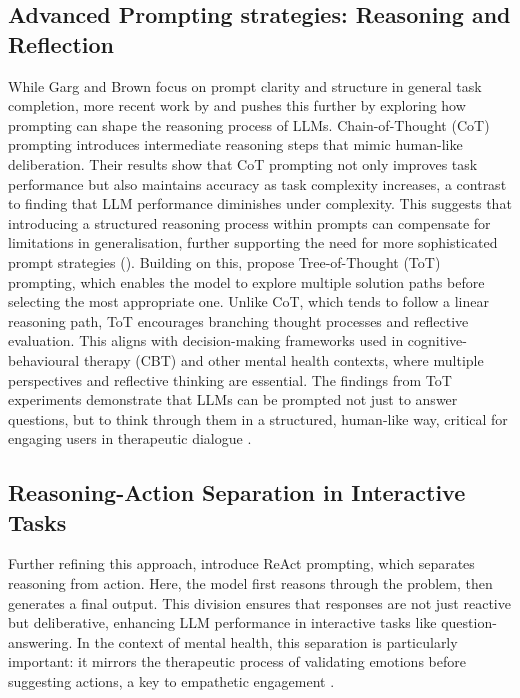 \subsection{Advanced Prompting strategies: Reasoning and Reflection} 
While Garg and Brown focus on prompt clarity and structure in general task completion, more recent work by \cite{wang2022self} and \cite{yao2023tree} pushes this further by exploring how prompting can shape the reasoning process of LLMs. \cite{wang2022self} Chain-of-Thought (CoT) prompting introduces intermediate reasoning steps that mimic human-like deliberation. Their results show that CoT prompting not only improves task performance but also maintains accuracy as task complexity increases, a contrast to \cite{garg2021transformers} finding that LLM performance diminishes under complexity. This suggests that introducing a structured reasoning process within prompts can compensate for limitations in generalisation, further supporting the need for more sophisticated prompt strategies (\cite{wang2022self}).
Building on this, \cite{yao2023tree} propose Tree-of-Thought (ToT) prompting, which enables the model to explore multiple solution paths before selecting the most appropriate one. Unlike CoT, which tends to follow a linear reasoning path, ToT encourages branching thought processes and reflective evaluation. This aligns with decision-making frameworks used in cognitive-behavioural therapy (CBT) and other mental health contexts, where multiple perspectives and reflective thinking are essential. The findings from ToT experiments demonstrate that LLMs can be prompted not just to answer questions, but to think through them in a structured, human-like way, critical for engaging users in therapeutic dialogue \cite{yao2023tree}.

\subsection{Reasoning-Action Separation in Interactive Tasks} 
Further refining this approach, \cite{yao2022react} introduce ReAct prompting, which separates reasoning from action. Here, the model first reasons through the problem, then generates a final output. This division ensures that responses are not just reactive but deliberative, enhancing LLM performance in interactive tasks like question-answering. In the context of mental health, this separation is particularly important: it mirrors the therapeutic process of validating emotions before suggesting actions, a key to empathetic engagement \cite{yao2022react}.

